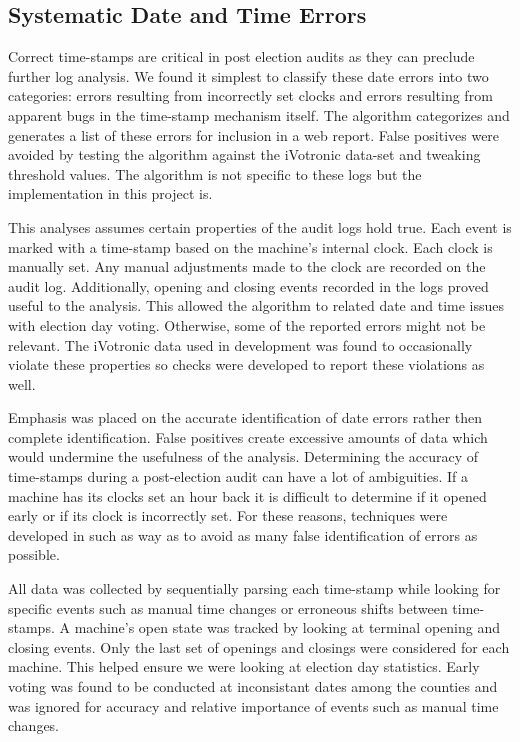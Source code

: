\subsection{Systematic Date and Time Errors}\label{an:date} Correct time-stamps
are critical in post election audits as they can preclude further log analysis.
We found it simplest to classify these date errors into two categories: errors
resulting from incorrectly set clocks and errors resulting from apparent bugs in
the time-stamp mechanism itself. The algorithm categorizes and generates a list
of these errors for inclusion in a web report. False positives were avoided by
testing the algorithm against the iVotronic data-set and tweaking threshold values.
The algorithm is not specific to these logs but the implementation in this
project is.

This analyses assumes certain properties of the audit logs hold true. Each event
is marked with a time-stamp based on the machine's internal clock. Each clock is
manually set.  Any manual adjustments made to the clock are recorded on the
audit log. Additionally, opening and closing events recorded in the logs proved
useful to the analysis. This allowed the algorithm to related date and time
issues with election day voting.  Otherwise, some of the reported errors might
not be relevant. The iVotronic data used in development was found to
occasionally violate these properties so checks were developed to report these
violations as well.

Emphasis was placed on the accurate identification of date errors rather then
complete identification. False positives create excessive amounts of data which
would undermine the usefulness of the analysis. Determining the accuracy of
time-stamps during a post-election audit can have a lot of ambiguities. If a
machine has its clocks set an hour back it is difficult to determine if it
opened early or if its clock is incorrectly set. For these reasons, techniques
were developed in such as way as to avoid as many false identification of errors
as possible.

All data was collected by sequentially parsing each time-stamp while looking for
specific events such as manual time changes or erroneous shifts between
time-stamps. A machine's open state was tracked by looking at terminal opening
and closing events. Only the last set of openings and closings were considered
for each machine. This helped ensure we were looking at election day statistics.
Early voting was found to be conducted at inconsistant dates among the counties
and was ignored for accuracy and relative importance of events such as manual
time changes.


